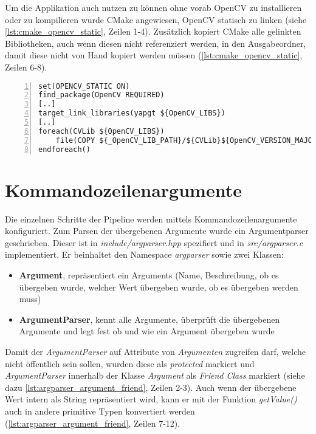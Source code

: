 Um die Applikation auch nutzen zu können ohne vorab OpenCV zu installieren oder zu kompilieren wurde CMake angewiesen, OpenCV statisch zu linken (siehe \autoref{lst:cmake_opencv_static}, Zeilen 1-4).
Zusätzlich kopiert CMake alle gelinkten Bibliotheken, auch wenn diesen nicht referenziert werden, in den Ausgabeordner, damit diese nicht von Hand kopiert werden müssen (\autoref{lst:cmake_opencv_static}, Zeilen 6-8).

\begin{lstlisting}[numbers=left, breaklines=true,breakatwhitespace=false,label=lst:cmake_opencv_static, caption=Ausschnitt von CMakeLists.txt um OpenCV statisch zu linken]
set(OPENCV_STATIC ON)
find_package(OpenCV REQUIRED)
[..]
target_link_libraries(yapgt ${OpenCV_LIBS})
[..]
foreach(CVLib ${OpenCV_LIBS})
    file(COPY ${_OpenCV_LIB_PATH}/${CVLib}${OpenCV_VERSION_MAJOR}${OpenCV_VERSION_MINOR}${OpenCV_VERSION_PATCH}d.dll DESTINATION ${CMAKE_BINARY_DIR})
endforeach()
\end{lstlisting}


\section{Kommandozeilenargumente}
Die einzelnen Schritte der Pipeline werden mittels Kommandozeilenargumente konfiguriert.
Zum Parsen der übergebenen Argumente wurde ein Argumentparser geschrieben.
Dieser ist in \emph{include/argparser.hpp} spezifiert und in \emph{src/argparser.c} implementiert.
Er beinhaltet den Namespace \emph{argparser} sowie zwei Klassen:
\begin{itemize}
\item \textbf{Argument}, repräsentiert ein Arguments (Name, Beschreibung, ob es übergeben wurde, welcher Wert übergeben wurde, ob es übergeben werden muss)
\item \textbf{ArgumentParser}, kennt alle Argumente, überprüft die übergebenen Argumente und legt fest ob und wie ein Argument übergeben wurde
\end{itemize}

Damit der \emph{ArgumentParser} auf Attribute von \emph{Argumenten} zugreifen darf, welche nicht öffentlich sein sollen, wurden diese als \emph{protected} markiert und \emph{ArgumentParser} innerhalb der Klasse \emph{Argument} als \emph{Friend Class} markiert (siehe dazu \autoref{lst:argparser_argument_friend}, Zeilen 2-3).
Auch wenn der übergebene Wert intern als String repräsentiert wird, kann er mit der Funktion \emph{getValue()} auch in andere primitive Typen konvertiert werden (\autoref{lst:argparser_argument_friend}, Zeilen 7-12).

